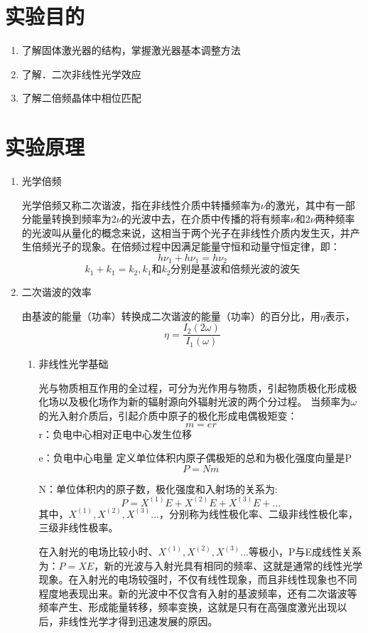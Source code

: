 \documentclass[UTF8]{ctexart}
\begin{document}
\section{实验目的}
\begin{enumerate}
	\item 了解固体激光器的结构，掌握激光器基本调整方法
	\item 了解．二次非线性光学效应
	\item 了解二倍频晶体中相位匹配
\end{enumerate}
\section{实验原理}
\begin{enumerate}
	\item 光学倍频
	
	光学倍频又称二次谐波，指在非线性介质中转播频率为$\nu$的激光，其中有一部分能量转换到频率为$2\nu$的光波中去，在介质中传播的将有频率$\nu$和$2\nu$两种频率的光波叫从量化的概念来说，这相当于两个光子在非线性介质内发生灭，并产生倍频光子的现象。在倍频过程中因满足能量守恒和动量守恒定律，即：
	$$h\nu_{1}+h\nu_{1}=h\nu_{2}$$
$$k_{1}+k_{1}=k_{2},k_{1}\mbox{和}k_{2}\mbox{分别是基波和倍频光波的波矢}$$
	\item 二次谐波的效率
	
	由基波的能量（功率）转换成二次谐波的能量（功率）的百分比，用$\eta$表示，
	$$\eta = \frac{I_{2}(2\omega)}{I_{1}(\omega)}$$
	\begin{enumerate}
		\item 非线性光学基础
		
		光与物质相互作用的全过程，可分为光作用与物质，引起物质极化形成极化场以及极化场作为新的辐射源向外辐射光波的两个分过程。
		当频率为$\omega$的光入射介质后，引起介质中原子的极化形成电偶极矩变：
		$$m=er$$
		r：负电中心相对正电中心发生位移
		
		e：负电中心电量
		定义单位体积内原子偶极矩的总和为极化强度向量是P
		$$P=Nm$$
		
		N：单位体积内的原子数，极化强度和入射场的关系为:
		$$P=X^(1)E+X^(2)E+X^(3)E+...$$
		其中，$X^(1),X^(2),X^(3)...$，分别称为线性极化率、二级非线性极化率，三级非线性极率。
		
		在入射光的电场比较小时、$X^(1),X^(2),X^(3)...$等极小，P与E成线性关系为：$P=XE$，新的光波与入射光具有相同的频率、这就是通常的线性光学现象。在入射光的电场较强时，不仅有线性现象，而且非线性现象也不同程度地表现出来。新的光波中不仅含有入射的基波频率，还有二次谐波等频率产生、形成能量转移，频率变换，这就是只有在高强度激光出现以后，非线性光学才得到迅速发展的原因。
		

\end{enumerate}
\end{enumerate}
\end{document}
